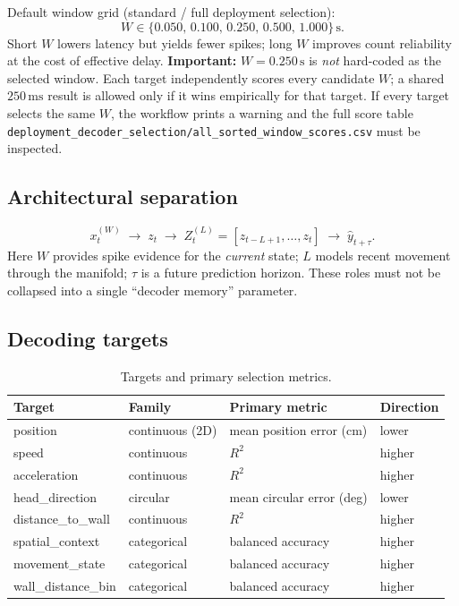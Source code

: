 \documentclass[11pt,a4paper]{article}
\begin{document}
Default window grid (standard / full deployment selection):
\begin{equation}
  W \in \{0.050,\, 0.100,\, 0.250,\, 0.500,\, 1.000\}\,\mathrm{s}.
\end{equation}
Short $W$ lowers latency but yields fewer spikes; long $W$ improves count reliability at the cost of effective delay.
\textbf{Important:} $W{=}0.250\,\mathrm{s}$ is \emph{not} hard-coded as the selected window.
Each target independently scores every candidate $W$; a shared $250\,\mathrm{ms}$ result is allowed only if it wins empirically for that target.
If every target selects the same $W$, the workflow prints a warning and the full score table
\texttt{deployment\_decoder\_selection/all\_sorted\_window\_scores.csv} must be inspected.

\subsection{Architectural separation}
\begin{equation}
  x_t^{(W)}
  \;\longrightarrow\;
  z_t
  \;\longrightarrow\;
  Z_t^{(L)}=[z_{t-L+1},\ldots,z_t]
  \;\longrightarrow\;
  \hat y_{t+\tau}.
  \label{eq:arch}
\end{equation}
Here $W$ provides spike evidence for the \emph{current} state; $L$ models recent movement through the manifold; $\tau$ is a future prediction horizon.
These roles must not be collapsed into a single ``decoder memory'' parameter.

\subsection{Decoding targets}
\begin{table}[h]
\centering
\caption{Targets and primary selection metrics.}
\label{tab:targets}
\small
\begin{tabular}{@{}llll@{}}
\toprule
Target & Family & Primary metric & Direction \\
\midrule
position & continuous (2D) & mean position error (cm) & lower \\
speed & continuous & $R^2$ & higher \\
acceleration & continuous & $R^2$ & higher \\
head\_direction & circular & mean circular error (deg) & lower \\
distance\_to\_wall & continuous & $R^2$ & higher \\
spatial\_context & categorical & balanced accuracy & higher \\
movement\_state & categorical & balanced accuracy & higher \\
wall\_distance\_bin & categorical & balanced accuracy & higher \\
\bottomrule
\end{tabular}
\end{table}
\end{document}

